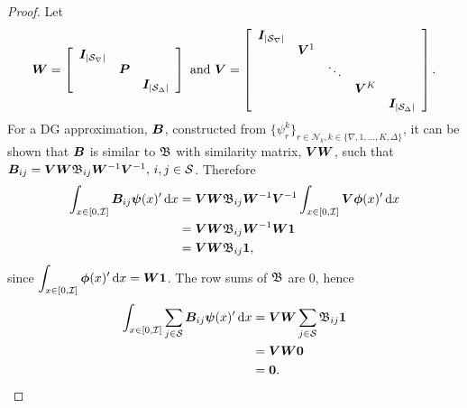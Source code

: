 \begin{proof}
Let 
\[ \boldsymbol W = \left[\begin{array}{ccc}
		\boldsymbol I_{|\mathcal{S}_\nabla|} & & \\
		& \boldsymbol P &  \\
		& & \boldsymbol I_{|\mathcal{S}_\Delta|}
	\end{array}\right]
\mbox{ and }
  \boldsymbol V = \left[\begin{array}{ccccc}
		\boldsymbol I_{|\mathcal{S}_\nabla|} & & & &  \\
		& \boldsymbol V^1 & & &  \\
		& & \ddots & & \\
		& & & \boldsymbol V^K \\
		& & & & \boldsymbol I_{|\mathcal{S}_\Delta|}
	\end{array}\right]. \]
For a DG approximation, \(\boldsymbol B\), constructed from \(\{\psi_r^k\}_{r\in\mathcal N_k,k\in\{\nabla,1,...,K,\Delta\}}\), it can be shown that \(\boldsymbol B\) is similar to \( {  {\mathfrak{\boldsymbol B}}}\) with similarity matrix, \(\boldsymbol V\boldsymbol W\), such that \(  \boldsymbol B_{ij} =  \boldsymbol V\boldsymbol W{ \mathfrak{\boldsymbol B}}_{ij}\boldsymbol W^{-1}\boldsymbol V^{-1},\,i,j\in\mathcal{S}\).
Therefore 
\begin{align*} 
	\int_{x\in[0,\mathcal I]}  \boldsymbol B_{ij}\boldsymbol\psi(x)'{} \, \mathrm{d} x &= \boldsymbol V\boldsymbol W { \mathfrak{\boldsymbol B}}_{ij}\boldsymbol W^{-1}\boldsymbol V ^{-1}\int_{x\in[0,\mathcal I]} \boldsymbol V\boldsymbol \phi(x)'{}\, \mathrm{d} x 
	\\&=\boldsymbol V\boldsymbol W { \mathfrak{\boldsymbol B}}_{ij}\boldsymbol W^{-1} \boldsymbol W\boldsymbol 1 \\&= \boldsymbol V \boldsymbol W { \mathfrak{\boldsymbol B}}_{ij}\boldsymbol 1,
\end{align*}
since \(\displaystyle\int_{x\in[0,\mathcal I]} \boldsymbol \phi(x)'{}\, \mathrm{d} x =\boldsymbol W\boldsymbol 1\).
The row sums of \(\mathfrak{\boldsymbol B}\) are 0, hence 
\begin{align}\label{eqn:Bsums0} 
	\int_{x\in[0,\mathcal I]}  \sum_{j\in\mathcal{S}}\boldsymbol B_{ij}\boldsymbol\psi(x)'{} \, \mathrm{d} x  &=  \boldsymbol V\boldsymbol W \sum_{j\in\mathcal{S}}{ \mathfrak{\boldsymbol B}}_{ij}\boldsymbol 1 \\&=  \boldsymbol V\boldsymbol W \boldsymbol 0 \\&= \boldsymbol 0.
\end{align}


\end{proof}
